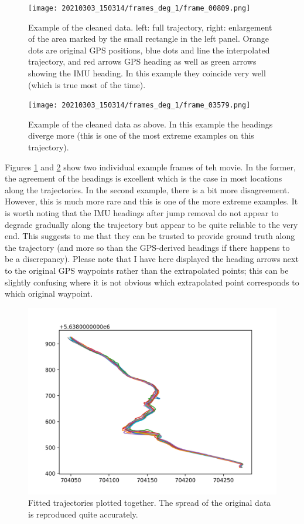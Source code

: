 \documentclass[a4]{article}
\begin{document}
\begin{figure}
  \texttt{[image: 20210303\_150314/frames\_deg\_1/frame\_00809.png]}
  \caption{\label{fig:frameEx1} Example of the cleaned data. left:
    full trajectory, right: enlargement of the area marked by the
    small rectangle in the left panel. Orange dots are original GPS
    positions, blue dots and line the interpolated trajectory, and red
    arrows GPS heading as well as green arrows showing the IMU
    heading. In this example they coincide very well (which is true
    most of the time).}
\end{figure}

\begin{figure}
  \texttt{[image: 20210303\_150314/frames\_deg\_1/frame\_03579.png]}
  \caption{\label{fig:frameEx2} Example of the cleaned data as
    above. In this example the headings diverge more (this is one of
    the most extreme examples on this trajectory).}
\end{figure}

Figures \ref{fig:frameEx1} and \ref{fig:frameEx2} show two individual
example frames of teh movie. In the former, the agreement of the headings is
excellent which is the case in most locations along the
trajectories. In the second example, there is a bit more
disagreement. However, this is much more rare and this is one of the
more extreme examples. It is worth noting that the IMU headings
after jump removal do not appear to degrade gradually along the
trajectory but appear to be quite reliable to the very end. This
suggests to me that they can be trusted to provide ground truth
along the trajectory (and more so than the GPS-derived headings
if there happens to be a discrepancy). Please note that I have here
displayed the heading arrows next to the original GPS waypoints
rather than the extrapolated points; this can be slightly confusing
where it is not obvious which extrapolated point corresponds to
which original waypoint.

\begin{figure}
  \includegraphics[width=\textwidth]{figures/fitted_trajectories_onepanel.png}
  \caption{\label{fig:fittedTraj1} Fitted trajectories plotted
    together. The spread of the original data is reproduced quite
    accurately.
    }
\end{figure}
\end{document}
